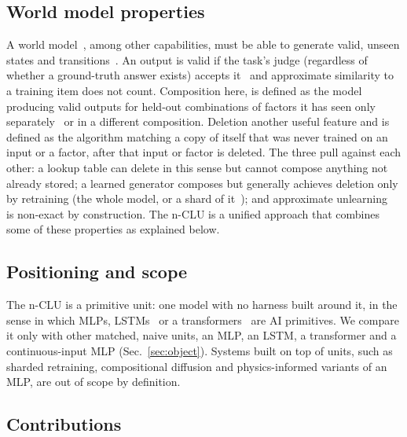 \documentclass{article} %
\begin{document}
\subsection{World model properties}
\label{sec:why}

A world model~\citep{ha_world_2018,hafner_mastering_2025}, among other capabilities, must be able to generate valid, unseen states and transitions~\citep{valevski_diffusion_2025}.
An output is valid if the task's judge (regardless of whether a ground-truth answer exists) accepts it~\citep{vafa_evaluating_2024} and approximate similarity to a training item does not count.
Composition here, is defined as the model producing valid outputs for held-out combinations of factors it has seen only separately~\citep{zhao_toward_2022} or in a different composition. Deletion another useful feature and is defined as the algorithm matching a copy of itself that was never trained on an input or a factor, after that input or factor
is deleted. The three pull against each other: a lookup table can delete in this sense but cannot compose
anything not already stored; a learned generator composes but generally achieves deletion only by retraining
(the whole model, or a shard of it~\citep{bourtoule_machine_2021}); and
approximate unlearning~\citep{guo_certified_2023,golatkar_eternal_2020} is non-exact by construction. The n-CLU is a unified approach that combines some of these properties as explained below.

\subsection{Positioning and scope}
\label{sec:positioning}

The n-CLU is a primitive unit: one model with no harness built around it, in the sense in which MLPs, LSTMs~\citep{hochreiter_long_1997} or a transformers~\citep{vaswani_attention_2023} are AI primitives. We compare it only with other matched, naive units, an MLP, an LSTM, a transformer and a continuous-input MLP (Sec.~\ref{sec:object}). Systems built on top of units, such as sharded retraining, compositional diffusion and physics-informed variants of an MLP, are out of scope by definition. 


\subsection{Contributions}
\label{sec:contrib}
\end{document}
